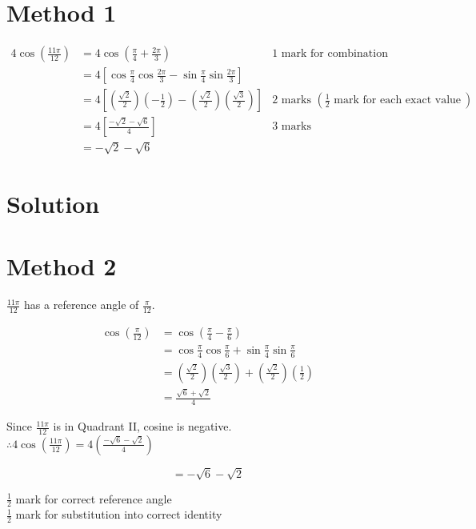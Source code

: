 \documentclass[10pt]{article}
\begin{document}
\section*{Method 1}
$$
\begin{array}{rlr}
4 \cos \left(\frac{11 \pi}{12}\right) & =4 \cos \left(\frac{\pi}{4}+\frac{2 \pi}{3}\right) & 1 \text { mark for combination } \\
& =4\left[\cos \frac{\pi}{4} \cos \frac{2 \pi}{3}-\sin \frac{\pi}{4} \sin \frac{2 \pi}{3}\right] & \\
& =4\left[\left(\frac{\sqrt{2}}{2}\right)\left(-\frac{1}{2}\right)-\left(\frac{\sqrt{2}}{2}\right)\left(\frac{\sqrt{3}}{2}\right)\right] & 2 \text { marks }\left(\frac{1}{2} \text { mark for each exact value }\right) \\
& =4\left[\frac{-\sqrt{2}-\sqrt{6}}{4}\right] & 3 \text { marks } \\
& =-\sqrt{2}-\sqrt{6}
\end{array}
$$

\section*{Solution}
\section*{Method 2}
$\frac{11 \pi}{12}$ has a reference angle of $\frac{\pi}{12}$.

$$
\begin{aligned}
\cos \left(\frac{\pi}{12}\right) & =\cos \left(\frac{\pi}{4}-\frac{\pi}{6}\right) \\
& =\cos \frac{\pi}{4} \cos \frac{\pi}{6}+\sin \frac{\pi}{4} \sin \frac{\pi}{6} \\
& =\left(\frac{\sqrt{2}}{2}\right)\left(\frac{\sqrt{3}}{2}\right)+\left(\frac{\sqrt{2}}{2}\right)\left(\frac{1}{2}\right) \\
& =\frac{\sqrt{6}+\sqrt{2}}{4}
\end{aligned}
$$

Since $\frac{11 \pi}{12}$ is in Quadrant II, cosine is negative.\\
$\therefore 4 \cos \left(\frac{11 \pi}{12}\right)=4\left(\frac{-\sqrt{6}-\sqrt{2}}{4}\right)$

$$
=-\sqrt{6}-\sqrt{2}
$$

$\frac{1}{2}$ mark for correct reference angle\\
$\frac{1}{2}$ mark for substitution into correct identity
\end{document}
